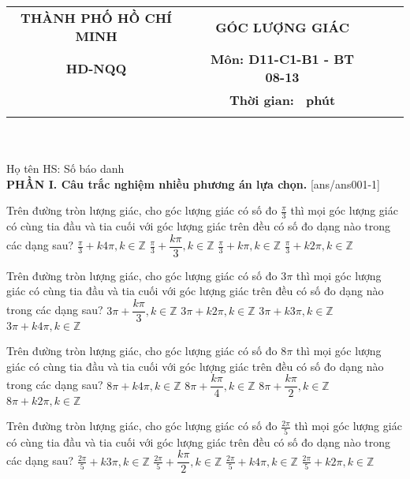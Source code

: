 \documentclass[12pt,a4paper]{article}
\newcommand{\tenso}{THÀNH PHỐ HỒ CHÍ MINH}
\newcommand{\tentruong}{HD-NQQ}
\newcommand{\tenkythi}{GÓC LƯỢNG GIÁC }
\newcommand{\tenmonthi}{Môn: D11-C1-B1 - BT 08-13}
\newcommand{\thoigian}{}
\newcommand{\tieude}[1]{
   \begin{tabular}{cm{1cm}cm{3cm}cm{3cm}}
    {\bf \tenso} & & {\bf \tenkythi} \\
    {\bf \tentruong} & & {\bf \tenmonthi}\\
    && {\bf Thời gian: \bf \thoigian \, phút}\\
    && { \fbox{\bf Mã đề: #1}}
   \end{tabular}\\\\
    
   {Họ tên HS: \dotfill Số báo danh \dotfill}\\
}
\newcommand{\chantrang}[2]{\rfoot{Trang \thepage $-$ Mã đề #2}}
\begin{document}


\tieude{001}
\setcounter{page}{1}
{\bf PHẦN I. Câu trắc nghiệm nhiều phương án lựa chọn.}
\setcounter{ex}{0}
[ans/ans001-1]
\begin{ex}
 Trên đường tròn lượng giác, cho góc lượng giác có số đo ${\frac{\pi}{3}}$ thì mọi góc lượng giác có cùng tia đầu và tia cuối với góc lượng giác trên đều có số đo dạng nào trong các dạng sau? 
\choice
{ $\frac{\pi}{3}+k4\pi, k\in \mathbb{Z}$ }
   { $\frac{\pi}{3}+\dfrac{k\pi }{3}, k\in \mathbb{Z}$ }
     { $\frac{\pi}{3}+k\pi, k\in \mathbb{Z}$ }
    { \True $\frac{\pi}{3}+k2\pi, k\in \mathbb{Z}$ }
\end{ex}

\begin{ex}
 Trên đường tròn lượng giác, cho góc lượng giác có số đo ${3 \pi}$ thì mọi góc lượng giác có cùng tia đầu và tia cuối với góc lượng giác trên đều có số đo dạng nào trong các dạng sau? 
\choice
{ $3 \pi+\dfrac{k\pi }{3}, k\in \mathbb{Z}$ }
   { \True $3 \pi+k2\pi, k\in \mathbb{Z}$ }
     { $3 \pi+k3\pi, k\in \mathbb{Z}$ }
    { $3 \pi+k4\pi, k\in \mathbb{Z}$ }
\end{ex}

\begin{ex}
 Trên đường tròn lượng giác, cho góc lượng giác có số đo ${8 \pi}$ thì mọi góc lượng giác có cùng tia đầu và tia cuối với góc lượng giác trên đều có số đo dạng nào trong các dạng sau? 
\choice
{ $8 \pi+k4\pi, k\in \mathbb{Z}$ }
   { $8 \pi+\dfrac{k\pi }{4}, k\in \mathbb{Z}$ }
     { $8 \pi+\dfrac{k\pi }{2}, k\in \mathbb{Z}$ }
    { \True $8 \pi+k2\pi, k\in \mathbb{Z}$ }
\end{ex}

\begin{ex}
 Trên đường tròn lượng giác, cho góc lượng giác có số đo ${\frac{2 \pi}{5}}$ thì mọi góc lượng giác có cùng tia đầu và tia cuối với góc lượng giác trên đều có số đo dạng nào trong các dạng sau? 
\choice
{ $\frac{2 \pi}{5}+k3\pi, k\in \mathbb{Z}$ }
   { $\frac{2 \pi}{5}+\dfrac{k\pi }{2}, k\in \mathbb{Z}$ }
     { $\frac{2 \pi}{5}+k4\pi, k\in \mathbb{Z}$ }
    { \True $\frac{2 \pi}{5}+k2\pi, k\in \mathbb{Z}$ }
\end{ex}
\end{document}
